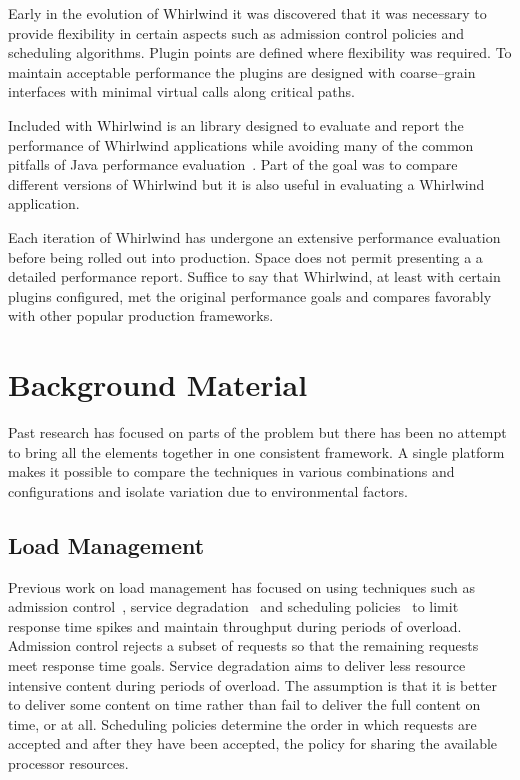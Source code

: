 \documentclass[conference]{IEEEtran}
\begin{document}
Early in the evolution of Whirlwind it was discovered that it was necessary to provide flexibility in certain aspects such as admission control policies and scheduling algorithms. Plugin points are defined where flexibility was required. To maintain acceptable performance the plugins are designed with coarse--grain interfaces with minimal virtual calls along critical paths. 

Included with Whirlwind is an library designed to evaluate and report the performance of Whirlwind applications while avoiding many of the common pitfalls of Java performance evaluation~\cite{Blackburn:EvaluationMethodology,Georges:JavaPerformance}. Part of the goal was to compare different versions of Whirlwind but it is also useful in evaluating a Whirlwind application.

Each iteration of Whirlwind has undergone an extensive performance evaluation before being rolled out into production. Space does not permit presenting a a detailed performance report. Suffice to say that Whirlwind, at least with certain plugins configured, met the original performance goals and compares favorably with other popular production frameworks.

\section{Background Material}

Past research has focused on parts of the problem but there has been no attempt to bring all the elements together in one consistent framework. A single platform makes it possible to compare the techniques in various combinations and configurations and isolate variation due to environmental factors.

\subsection{Load Management}

Previous work on load management has focused on using techniques such as admission control~\cite{Voigt:2001qe,Cherkasova:2002yb,srinivas00webk,Kanodia:2000qv,welsh03Adaptive,Elnikety:2004ty}, service degradation~\cite{welsh03Adaptive,abdelzaher99web} and scheduling policies~\cite{Zhou06RequestAware,Behren03Capriccio,Schroeder06Overload,Crovella99Alpha,Cherkasova1998Strategy,Larus:2002:Cohort} to limit response time spikes and maintain throughput during periods of overload. Admission control rejects a subset of requests so that the remaining requests meet response time goals. Service degradation aims to deliver less resource intensive content during periods of overload. The assumption is that it is better to deliver some content on time rather than fail to deliver the full content on time, or at all. Scheduling policies determine the order in which requests are accepted and after they have been accepted, the policy for sharing the available processor resources.
\end{document}
